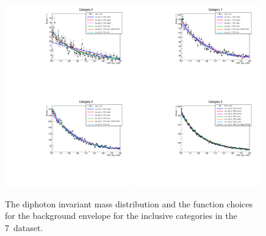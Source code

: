 \begin{figure}
  \includegraphics[width=0.49\textwidth]{ch5_anal_and_results/plots/mva_7TeV/multipdf_cat0.pdf}
  \includegraphics[width=0.49\textwidth]{ch5_anal_and_results/plots/mva_7TeV/multipdf_cat1.pdf}\\
  \includegraphics[width=0.49\textwidth]{ch5_anal_and_results/plots/mva_7TeV/multipdf_cat2.pdf}
  \includegraphics[width=0.49\textwidth]{ch5_anal_and_results/plots/mva_7TeV/multipdf_cat3.pdf}\\
  \caption{The diphoton invariant mass distribution and the function choices for the background envelope for the inclusive categories in the 7~\TeV dataset. }
  \label{fig:multipdf1}
\end{figure}

